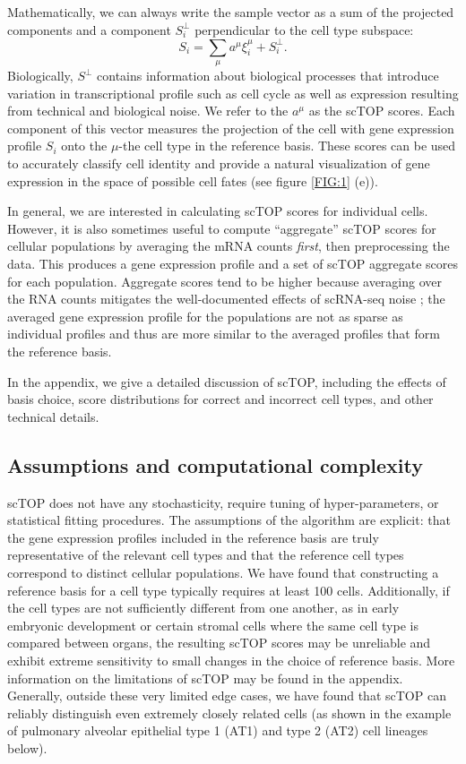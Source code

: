 \documentclass[aps,superscriptaddress, notitlepage,longbibliography]{revtex4-1}
\def\be{\begin{equation}}
\def\ee{\end{equation}}
\begin{document}
Mathematically, we can always write the sample vector as a sum of the projected components and a component $S^{\perp}_i$  perpendicular to the cell type subspace: 
\be
S_i = \sum_\mu a^{\mu} \xi^{\mu}_i + S^{\perp}_i.
\ee
Biologically, $S^{\perp}$ contains information about biological processes that introduce variation in transcriptional profile such as cell cycle as well as expression resulting from technical and biological noise. We refer to the $a^\mu$ as the scTOP scores. Each component of this vector measures the projection of the cell with gene expression profile $S_i$ onto the $\mu$-the cell type in the reference basis. These scores can be used to accurately classify cell identity and provide a natural visualization of gene expression in the space of possible cell fates (see figure \ref{FIG:1} (e)). 

In general, we are interested in calculating scTOP scores for individual cells. However, it is also sometimes useful to compute ``aggregate'' scTOP scores for cellular populations by averaging the mRNA counts \textit{first}, then preprocessing the data. This produces a gene expression profile and a set of scTOP aggregate scores for each population. Aggregate scores tend to be higher because averaging over the RNA counts mitigates the well-documented effects of scRNA-seq noise \cite{hicks2018missing, lahnemann_eleven_2020}; the averaged gene expression profile for the populations are not as sparse as individual profiles and thus are more similar to the averaged profiles that form the reference basis.

 In the appendix, we give a detailed discussion of scTOP, including the effects of basis choice, score distributions for correct and incorrect cell types, and other technical details.


\subsection{Assumptions and computational complexity}

scTOP does not have any stochasticity, require tuning of hyper-parameters, or statistical fitting procedures. The assumptions of the algorithm are explicit: that the gene expression profiles included in the reference basis are truly representative of the relevant cell types and that the reference cell types correspond to distinct cellular populations. We have found that constructing a reference basis for a cell type typically requires at least 100 cells. Additionally, if the cell types are not sufficiently different from one another, as in early embryonic development or certain stromal cells where the same cell type is compared between organs, the resulting scTOP scores may be unreliable and exhibit extreme sensitivity to small changes in the choice of reference basis. More information on the limitations of scTOP may be found in the appendix. Generally, outside these very limited edge cases, we have found that scTOP can reliably distinguish even extremely closely related cells (as shown in the example of pulmonary alveolar epithelial type 1 (AT1) and type 2 (AT2) cell lineages below).
\end{document}
